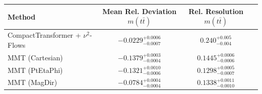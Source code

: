     \begin{tabular}{lccc}
        \toprule
        Method & Mean Rel. Deviation $m(t\bar{t})$ & Rel. Resolution $m(t\bar{t})$ \\
        \midrule
        CompactTransformer + $\nu^2$-Flows & $-0.0229^{+0.0006}_{-0.0007}$ & $0.240^{+0.005}_{-0.004}$ \\
        MMT (Cartesian) & $-0.1379^{+0.0003}_{-0.0004}$ & $0.1445^{+0.0006}_{-0.0006}$ \\
        MMT (PtEtaPhi) & $-0.1321^{+0.0010}_{-0.0006}$ & $0.1298^{+0.0005}_{-0.0007}$ \\
        MMT (MagDir) & $-0.0784^{+0.0004}_{-0.0004}$ & $0.1338^{+0.0011}_{-0.0010}$ \\
        \bottomrule
    \end{tabular}